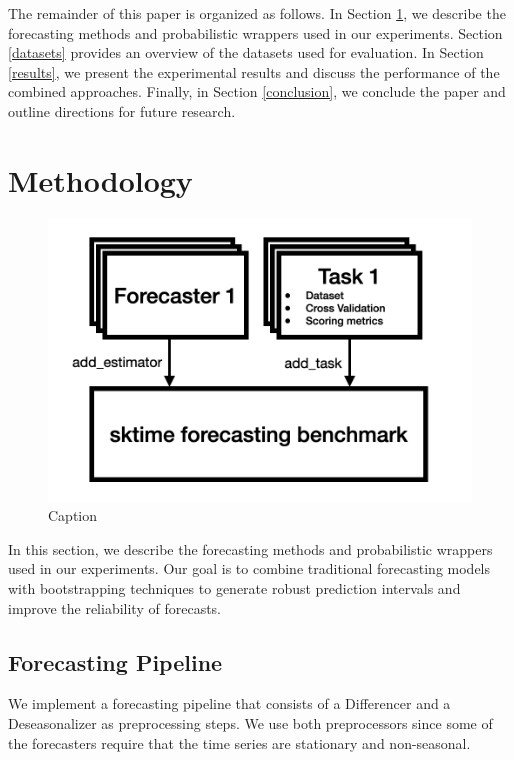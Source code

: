 \documentclass{article}
\begin{document}
The remainder of this paper is organized as follows. In Section \ref{methods}, we describe the forecasting methods and probabilistic wrappers used in our experiments. Section \ref{datasets} provides an overview of the datasets used for evaluation. In Section \ref{results}, we present the experimental results and discuss the performance of the combined approaches. Finally, in Section \ref{conclusion}, we conclude the paper and outline directions for future research.

\section{Methodology} \label{methods}

\begin{figure}
    \centering
    \includegraphics[width=.5\textwidth]{Figures/evaluationFramework.png}
    \caption{Caption}
    \label{fig:enter-label}
\end{figure}
In this section, we describe the forecasting methods and probabilistic wrappers used in our experiments. Our goal is to combine traditional forecasting models with bootstrapping techniques to generate robust prediction intervals and improve the reliability of forecasts.

\subsection{Forecasting Pipeline}
We implement a forecasting pipeline that consists of a Differencer and a Deseasonalizer as preprocessing steps. We use both preprocessors since some of the forecasters require that the time series are stationary and non-seasonal.
\end{document}
